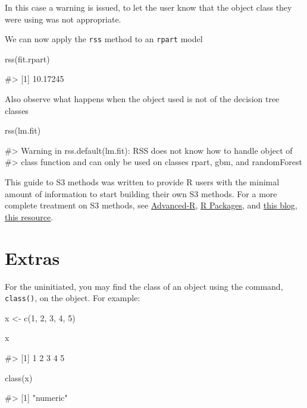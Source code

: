 In this case a warning is issued, to let the user know that the object
class they were using was not appropriate.

We can now apply the \texttt{rss} method to an \texttt{rpart} model

\begin{Schunk}
\begin{Sinput}
rss(fit.rpart)
\end{Sinput}
\begin{Soutput}
#> [1] 10.17245
\end{Soutput}
\end{Schunk}

Also observe what happens when the object used is not of the decision
tree classes

\begin{Schunk}
\begin{Sinput}
rss(lm.fit)
\end{Sinput}
\begin{Soutput}
#> Warning in rss.default(lm.fit): RSS does not know how to handle object of
#> class function and can only be used on classes rpart, gbm, and randomForest
\end{Soutput}
\end{Schunk}

This guide to S3 methods was written to provide R users with the minimal
amount of information to start building their own S3 methods. For a more
complete treatment on S3 methods, see \href{}{Advanced-R}, \href{}{R
Packages}, and \href{}{this blog}, \href{}{this resource}.

\section{Extras}\label{extras}

For the uninitiated, you may find the class of an object using the
command, \texttt{class()}, on the object. For example:

\begin{Schunk}
\begin{Sinput}
x <- c(1, 2, 3, 4, 5)

x
\end{Sinput}
\begin{Soutput}
#> [1] 1 2 3 4 5
\end{Soutput}
\begin{Sinput}
class(x)
\end{Sinput}
\begin{Soutput}
#> [1] "numeric"
\end{Soutput}
\end{Schunk}

